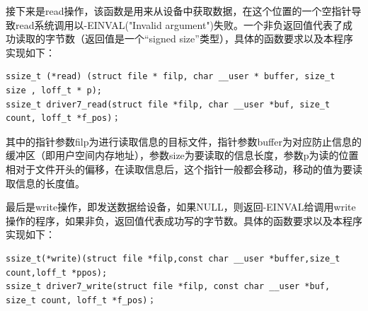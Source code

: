\documentclass[UTF8]{ctexart}
\begin{document}
接下来是read操作，该函数是用来从设备中获取数据，在这个位置的一个空指针导致read系统调用以-EINVAL("Invalid argument")失败。一个非负返回值代表了成功读取的字节数（返回值是一个“signed size”类型），具体的函数要求以及本程序实现如下：\par
\lstset{language = c}
\begin{lstlisting}
ssize_t (*read) (struct file * filp, char __user * buffer, size_t    size , loff_t * p);
ssize_t driver7_read(struct file *filp, char __user *buf, size_t count, loff_t *f_pos)；
\end{lstlisting}

其中的指针参数filp为进行读取信息的目标文件，指针参数buffer为对应防止信息的缓冲区（即用户空间内存地址），参数size为要读取的信息长度，参数p为读的位置相对于文件开头的偏移，在读取信息后，这个指针一般都会移动，移动的值为要读取信息的长度值。\par

最后是write操作，即发送数据给设备，如果NULL，则返回-EINVAL给调用write操作的程序，如果非负，返回值代表成功写的字节数。具体的函数要求以及本程序实现如下：\par
\lstset{language = c}
\begin{lstlisting}
ssize_t(*write)(struct file *filp,const char __user *buffer,size_t count,loff_t *ppos);
ssize_t driver7_write(struct file *filp, const char __user *buf, size_t count, loff_t *f_pos)；
\end{lstlisting}
\end{document}
